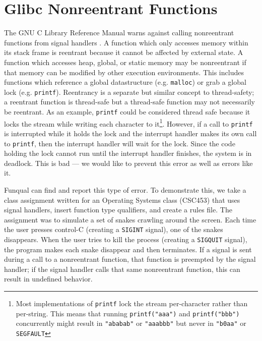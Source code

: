 \section{Glibc Nonreentrant Functions}\label{sec:app:reentrancy}


The GNU C Library Reference Manual warns against calling nonreentrant functions from signal handlers \cite{gnu-manual}.  A function which only accesses memory within its stack frame is reentrant because it cannot be affected by external state.  A function which accesses heap, global, or static memory may be nonreentrant if that memory can be modified by other execution environments.  This includes functions which reference a global datastructure (e.g. \lstinline{malloc}) or grab a global lock (e.g. \lstinline{printf}).  Reentrancy is a separate but similar concept to thread-safety; a reentrant function is thread-safe but a thread-safe function may not necessarily be reentrant.  As an example, \lstinline{printf} could be considered thread safe because it locks the stream while writing each character to it\footnote{Most implementations of \lstinline{printf} lock the stream per-character rather than per-string.  This means that running \mbox{\lstinline{printf("aaa")}} and \mbox{\lstinline{printf("bbb")}} concurrently might result in \mbox{\lstinline{"ababab"}} or \mbox{\lstinline{"aaabbb"}} but never in \mbox{\lstinline{"b0aa"}} or \mbox{\lstinline{SEGFAULT}}}.  However, if a call to \lstinline{printf} is interrupted while it holds the lock and the interrupt handler makes its own call to \lstinline{printf}, then the interrupt handler will wait for the lock.  Since the code holding the lock cannot run until the interrupt handler finishes, the system is in deadlock.  This is bad --- we would like to prevent this error as well as errors like it.  

Funqual can find and report this type of error.  To demonstrate this, we take a class assignment written for an Operating Systems class (CSC453) that uses signal handlers, insert function type qualifiers, and create a rules file.  The assignment was to simulate a set of snakes crawling around the screen.  Each time the user presses control-C (creating a \lstinline{SIGINT} signal), one of the snakes disappears.  When the user tries to kill the process (creating a \lstinline{SIGQUIT} signal), the program makes each snake disappear and then terminates.  If a signal is sent during a call to a nonreentrant function, that function is preempted by the signal handler; if the signal handler calls that same nonreentrant function, this can result in undefined behavior.  

